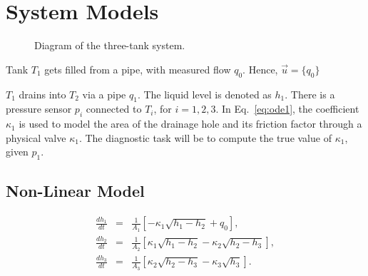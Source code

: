 \section{System Models}


\begin{figure}[htb]
  \centering
  \caption{Diagram of the three-tank system.}
  \label{fig:three_tanks}
\end{figure}
\par\noindent

Tank $T_1$ gets filled from a pipe, with measured flow $q_0$. Hence, $\vec{u}=\{q_0\}$%

$T_1$ drains into $T_2$ via a pipe $q_1$. The liquid level is denoted as $h_1$. There is a pressure sensor $p_i$ connected to $T_i$, for $i=1,2,3$.
In Eq.~\ref{eq:ode1}, the coefficient $\kappa_1$ is used to model the area of the drainage hole and its friction factor through a physical valve $\kappa_1$.%
The diagnostic task will be to compute the true value of $\kappa_1$, given $p_1$.

\subsection{Non-Linear Model}

\begin{eqnarray}
\frac{d h_1}{dt} & = & \frac{1}{A_1}\left[  - \kappa_1 \sqrt{h_1 - h_2} + q_0 \right],    \label{eq:ode1} \\
\frac{d h_2}{dt} &  = & \frac{1}{A_2}\left[   \kappa_{1} \sqrt{h_{1}-h_{2}} - \kappa_2 \sqrt{h_2-h_3}\right],\\
\frac{d h_3}{dt} & = & \frac{1}{A_3}\left[   \kappa_{2} \sqrt{h_2-h_3} - \kappa_3 \sqrt{h_3}\right].
\end{eqnarray}


